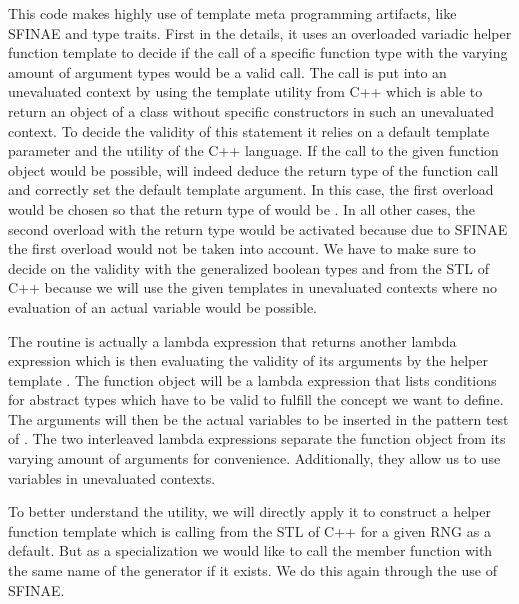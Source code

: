 \documentclass{stdlocal}
\begin{document}
    This code makes highly use of template meta programming artifacts, like SFINAE and type traits.
    First in the details, it uses an overloaded variadic helper function template  to decide if the call of a specific function type  with the varying amount of argument types  would be a valid call.
    The call is put into an unevaluated context by using the  template utility from C++ which is able to return an object of a class without specific constructors in such an unevaluated context.
    To decide the validity of this statement it relies on a default template parameter and the  utility of the C++ language.
    If the call to the given function object would be possible,  will indeed deduce the return type of the function call and correctly set the default template argument.
    In this case, the first overload would be chosen so that the return type of  would be .
    In all other cases, the second overload with the return type  would be activated because due to SFINAE the first overload would not be taken into account.
    We have to make sure to decide on the validity with the generalized boolean types  and  from the STL of C++ because we will use the given templates in unevaluated contexts where no evaluation of an actual  variable would be possible.

    The routine  is actually a lambda expression that returns another lambda expression which is then evaluating the validity of its arguments by the helper template .
    The function object  will be a lambda expression that lists conditions for abstract types which have to be valid to fulfill the concept we want to define.
    The arguments  will then be the actual variables to be inserted in the pattern test of .
    The two interleaved lambda expressions separate the function object  from its varying amount of arguments  for convenience.
    Additionally, they allow us to use variables in unevaluated contexts.

    To better understand the utility, we will directly apply it to construct a helper function template  which is calling  from the STL of C++ for a given RNG as a default.
    But as a specialization we would like to call the member function with the same name of the generator if it exists.
    We do this again through the use of SFINAE.
\end{document}
